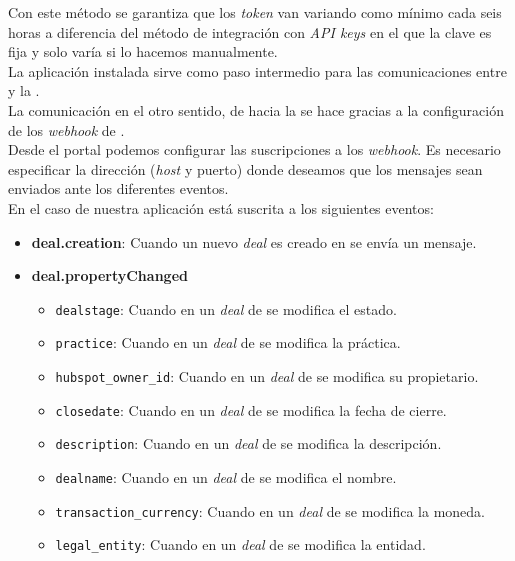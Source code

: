 Con este método se garantiza que los \textit{token} van variando como mínimo cada seis horas a diferencia del método de integración con \textit{API keys} en el que la  clave es fija y solo varía si lo hacemos manualmente.\\ 

La aplicación instalada sirve como paso intermedio para las comunicaciones entre \hs{} y la \iface{}.\\

La comunicación en el otro sentido, de \hs{} hacia la \iface{} se hace gracias a la configuración de los \textit{webhook} de \hs{}.\\

Desde el portal podemos configurar las suscripciones a los \textit{webhook}. Es necesario especificar la dirección (\textit{host} y puerto) donde deseamos que los mensajes sean enviados ante los diferentes eventos.\\

En el caso de nuestra aplicación está suscrita a los siguientes eventos:
\begin{itemize}
	\item \textbf{deal.creation}: Cuando un nuevo \textit{deal} es creado en \hs{} se envía un mensaje.
	\item \textbf{deal.propertyChanged} 
		\begin{itemize}
			\item \texttt{dealstage}: Cuando en un \textit{deal} de \hs{} se modifica el estado.
			\item \texttt{practice}: Cuando en un \textit{deal} de \hs{} se modifica la práctica.
			\item \texttt{hubspot\_owner\_id}: Cuando en un \textit{deal} de \hs{} se modifica su propietario.
			\item \texttt{closedate}: Cuando en un \textit{deal} de \hs{} se modifica la fecha de cierre.
			\item \texttt{description}: Cuando en un \textit{deal} de \hs{} se modifica la descripción.
			\item \texttt{dealname}: Cuando en un \textit{deal} de \hs{} se modifica el nombre.
			\item \texttt{transaction\_currency}: Cuando en un \textit{deal} de \hs{} se modifica la moneda.
			\item \texttt{legal\_entity}: Cuando en un \textit{deal} de \hs{} se modifica la entidad.
		\end{itemize}
\end{itemize}


